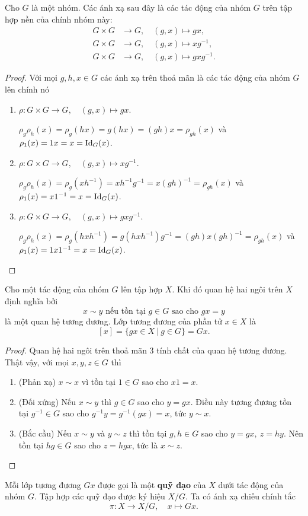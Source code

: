 \begin{exam*}
    Cho $G$ là một nhóm. Các ánh xạ sau đây là các tác động của nhóm $G$ trên tập hợp nền của chính nhóm này:
    \begin{align*}
        G \times G &\to G,\quad (g,x)\mapsto gx,\\
        G \times G &\to G,\quad (g,x)\mapsto xg^{-1},\\
        G \times G &\to G,\quad (g,x)\mapsto gxg^{-1}.
    \end{align*}
\end{exam*}
\begin{proof}
    Với mọi $g,h,x\in G$ các ánh xạ trên thoả mãn là các tác động của nhóm $G$ lên chính nó
    \begin{enumerate}
        \item $\rho: G \times G \to G,\quad (g,x)\mapsto gx$.
        
        $\rho_g\rho_h(x) = \rho_g(hx) = g(hx)=(gh)x = \rho_{gh}(x)$ và $\rho_1(x) = 1x=x = \operatorname{Id}_G(x)$.

        \item $\rho: G \times G \to G,\quad (g,x)\mapsto xg^{-1}$.
        
        $\rho_g\rho_h(x) = \rho_g(xh^{-1}) = xh^{-1}g^{-1}= x(gh)^{-1} = \rho_{gh}(x)$ và $\rho_1(x) = x1^{-1}=x = \operatorname{Id}_G(x)$.

        \item $\rho: G \times G \to G,\quad (g,x)\mapsto gxg^{-1}$.

        $\rho_g\rho_h(x) = \rho_g(hxh^{-1}) = g(hxh^{-1})g^{-1}= (gh)x(gh)^{-1} = \rho_{gh}(x)$ và $\rho_1(x) = 1x1^{-1}=x = \operatorname{Id}_G(x)$.
    \end{enumerate}
\end{proof}
\begin{prop}\label{prop 1.1.3}
    Cho một tác động của nhóm $G$ lên tập hợp $X$. Khi đó quan hệ hai ngôi trên $X$ định nghĩa bởi 
    \[x\sim y \text{ nếu tồn tại } g\in G \text{ sao cho } gx =y\]
    là một quan hệ tương đương. Lớp tương đương của phần tử $x \in X$ là 
    \[[x]  = \{gx\in X~|~g\in G\}=Gx.\]
\end{prop}
\begin{proof}
    Quan hệ hai ngôi trên thoả mãn 3 tính chất của quan hệ tương đương. Thật vậy, với mọi $x,y,z \in G$ thì
    \begin{enumerate}
        \item (Phản xạ) $x\sim x$ vì tồn tại $1\in G$ sao cho $x1=x$.
        \item (Đối xứng) Nếu $x\sim y$ thì $g \in G$ sao cho $y = gx$. Điều này tương đương tồn tại $g^{-1} \in G$ sao cho $g^{-1}y = g^{-1}(gx) = x$, tức $y \sim x$.
        \item (Bắc cầu) Nếu $x \sim y$ và $y\sim z$ thì tồn tại $g,h \in G$ sao cho $y = gx,~z=hy$. Nên tồn tại $hg \in G$ sao cho $z = hgx$, tức là $x \sim z$.
        \end{enumerate}
\end{proof}
Mỗi lớp tương đương $Gx$ được gọi là một \textbf{quỹ đạo} của $X$ dưới tác động của nhóm $G$. Tập hợp các quỹ đạo được ký hiệu $X/G$. Ta có ánh xạ chiếu chính tắc 
\[\pi: X \to X/G,\quad x\mapsto Gx.\]

